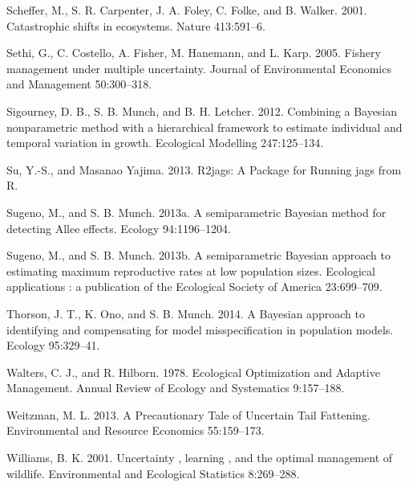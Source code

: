 \documentclass[author-year, 12pt,review]{components/elsarticle} %
\begin{document}
Scheffer, M., S. R. Carpenter, J. A. Foley, C. Folke, and B. Walker.
2001. Catastrophic shifts in ecosystems. Nature 413:591--6.

Sethi, G., C. Costello, A. Fisher, M. Hanemann, and L. Karp. 2005.
Fishery management under multiple uncertainty. Journal of Environmental
Economics and Management 50:300--318.

Sigourney, D. B., S. B. Munch, and B. H. Letcher. 2012. Combining a
Bayesian nonparametric method with a hierarchical framework to estimate
individual and temporal variation in growth. Ecological Modelling
247:125--134.

Su, Y.-S., and Masanao Yajima. 2013. R2jags: A Package for Running jags
from R.

Sugeno, M., and S. B. Munch. 2013a. A semiparametric Bayesian method for
detecting Allee effects. Ecology 94:1196--1204.

Sugeno, M., and S. B. Munch. 2013b. A semiparametric Bayesian approach
to estimating maximum reproductive rates at low population sizes.
Ecological applications : a publication of the Ecological Society of
America 23:699--709.

Thorson, J. T., K. Ono, and S. B. Munch. 2014. A Bayesian approach to
identifying and compensating for model misspecification in population
models. Ecology 95:329--41.

Walters, C. J., and R. Hilborn. 1978. Ecological Optimization and
Adaptive Management. Annual Review of Ecology and Systematics
9:157--188.

Weitzman, M. L. 2013. A Precautionary Tale of Uncertain Tail Fattening.
Environmental and Resource Economics 55:159--173.

Williams, B. K. 2001. Uncertainty , learning , and the optimal
management of wildlife. Environmental and Ecological Statistics
8:269--288.
\end{document}
